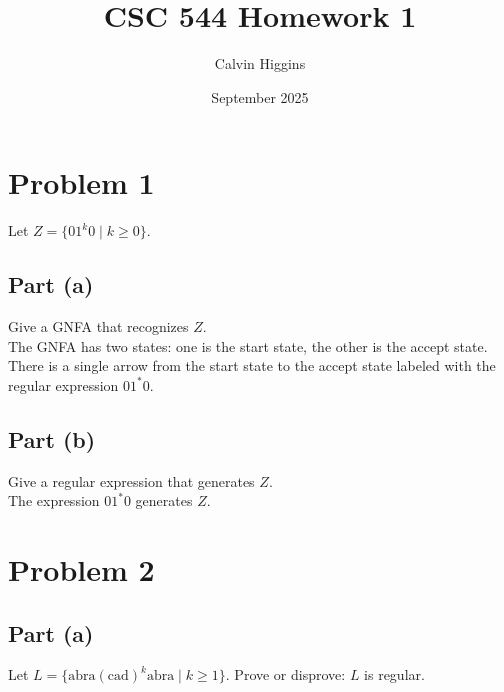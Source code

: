 \documentclass{article}
\title{CSC 544 Homework 1}
\author{Calvin Higgins}
\date{September 2025}
\begin{document}
\maketitle

\section*{Problem 1}

Let $Z = \{ 0 1^k 0 \mid k \geq 0 \}$.

\subsection*{Part (a)}

Give a GNFA that recognizes $Z$. \\

\noindent
The GNFA has two states: one is the start state, the other is the accept state. There is a single arrow from the start state to the accept state labeled with 
the regular expression $01^*0$. 

\subsection*{Part (b)}

Give a regular expression that generates $Z$. \\

\noindent
The expression $01^*0$ generates $Z$.

\section*{Problem 2}

\subsection*{Part (a)}

Let $L = \{ \text{abra}(\text{cad})^k\text{abra} \mid k \geq 1 \}$. Prove or disprove: $L$ is regular.
\end{document}
